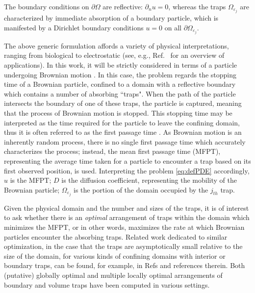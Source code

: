 \documentclass[11pt,letter,subeqn,fleqn]{article}
\newcommand{\veps}{\varepsilon}     %
\begin{document}
The boundary conditions on $\partial \Omega$ are reflective: $\partial_n u = 0$, whereas the traps $\Omega_{\veps_j}$ are characterized by immediate absorption of a boundary particle, which is manifested by a Dirichlet boundary conditions $u = 0$ on all $\partial\Omega_{\veps_j}$.

The above generic formulation affords a variety of physical interpretations, ranging from biological to electrostatic (see, e.g., Ref.~\cite{red2001, holcman2014narrow} for an overview of applications). In this work, it will be strictly considered in terms of a particle undergoing Brownian motion \cite{saffman1975brownian}. In this case, the problem  regards the stopping time
\cite{red2001, ralf2014first}
of a Brownian particle,
confined to a domain with a reflective boundary which contains a number of absorbing ``traps". When the path of the particle intersects the boundary of one of these traps, the particle is captured, meaning that the process of Brownian motion is stopped. This stopping time may be interpreted as the time required for the particle to leave the confining domain, thus it is often referred to as the first passage time \cite{bressloff2008diffusion, bressloff2013stochastic, holcman2004escape}.
As Brownian motion is an inherently random process, there is no single first passage time which accurately characterizes the process; instead, the mean first passage time (MFPT), representing the average time taken for a particle to encounter a trap based on its first observed position, is used.
Interpreting the problem \eqref{eq:defPDE} accordingly, $u$ is the MFPT; $D$ is the diffusion coefficient, representing the mobility of the Brownian particle;  $\Omega_{\veps_j}$ is the portion of the domain occupied by the $j_{th}$ trap.

Given the physical domain and the number and sizes of the traps, it is of interest to ask whether there is an \emph{optimal} arrangement of traps within the domain which minimizes the MFPT, or in other words, maximizes the rate at which Brownian particles encounter the absorbing traps. Related work dedicated to similar optimization, in the case that the traps are asymptotically small relative to the size of the domain, for various kinds of confining domains with interior or boundary traps, can be found, for example, in Refs \cite{kolokolnikov2005optimizing, iyaniwura2020optimization, cheviakov2011optimizing, gilbert2019globally, ridgway2019locally} and references therein. Both (putative) globally optimal and multiple locally optimal arrangements of boundary and volume traps have been computed in various settings.
\end{document}
